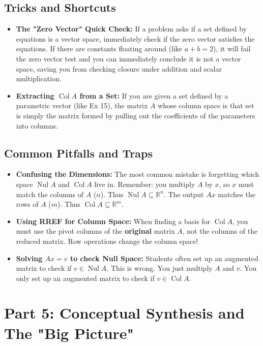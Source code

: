\documentclass[11pt]{article}
\begin{document}
\subsection{Tricks and Shortcuts}
\begin{itemize}
    \item \textbf{The "Zero Vector" Quick Check:} If a problem asks if a set defined by equations is a vector space, immediately check if the zero vector satisfies the equations. If there are constants floating around (like $a+b=2$), it will fail the zero vector test and you can immediately conclude it is not a vector space, saving you from checking closure under addition and scalar multiplication.
    \item \textbf{Extracting $\operatorname{Col} A$ from a Set:} If you are given a set defined by a parametric vector (like Ex 15), the matrix $A$ whose column space is that set is simply the matrix formed by pulling out the coefficients of the parameters into columns.
\end{itemize}

\subsection{Common Pitfalls and Traps}
\begin{itemize}
    \item \textbf{Confusing the Dimensions:} The most common mistake is forgetting which space $\operatorname{Nul} A$ and $\operatorname{Col} A$ live in. Remember: you multiply $A$ by $x$, so $x$ must match the columns of $A$ ($n$). Thus $\operatorname{Nul} A \subseteq \mathbb{R}^n$. The output $Ax$ matches the rows of $A$ ($m$). Thus $\operatorname{Col} A \subseteq \mathbb{R}^m$.
    \item \textbf{Using RREF for Column Space:} When finding a basis for $\operatorname{Col} A$, you must use the pivot columns of the \textbf{original} matrix $A$, not the columns of the reduced matrix. Row operations change the column space!
    \item \textbf{Solving $Ax=v$ to check Null Space:} Students often set up an augmented matrix to check if $v \in \operatorname{Nul} A$. This is wrong. You just multiply $A$ and $v$. You only set up an augmented matrix to check if $v \in \operatorname{Col} A$.
\end{itemize}

\newpage

\section{Part 5: Conceptual Synthesis and The "Big Picture"}
\end{document}
